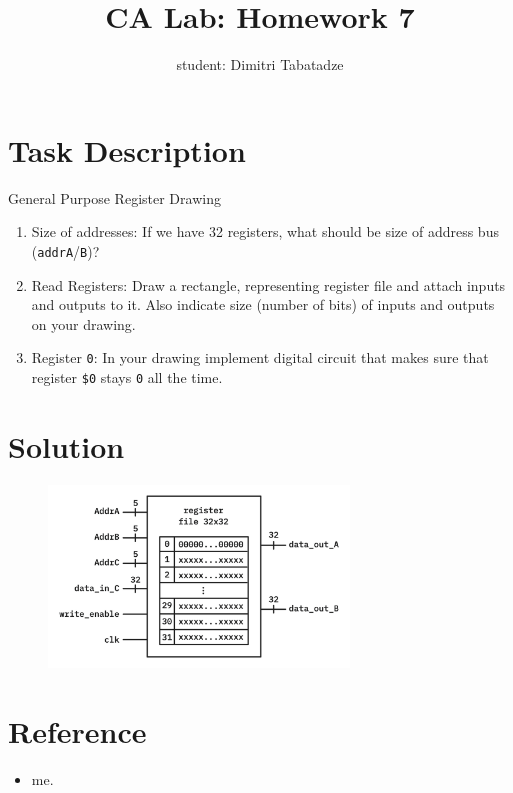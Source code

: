 \documentclass{article}
\title{CA Lab: Homework 7}
\author{student: Dimitri Tabatadze}
\begin{document}
    \maketitle

    \section*{Task Description} 
    
    {General Purpose Register Drawing}



    \begin{enumerate}
        \item Size of addresses: If we have 32 registers, what should be size of address bus (\verb|addrA|/\verb|B|)?
        \item Read Registers: Draw a rectangle, representing register file and attach inputs and outputs to it. Also indicate size (number of bits) of inputs and outputs on your drawing.
        \item Register \verb|0|: In your drawing implement digital circuit that makes sure that register \verb|$0| stays \verb|0| all the time.
    \end{enumerate}

    \section*{Solution}

    \begin{figure}[h]
        \begin{center}
            \includegraphics[width=8cm]{shapes.png}
        \end{center}
    \end{figure}

    \section*{Reference}
    
    \begin{itemize}
        \item me.
    \end{itemize}
\end{document}
